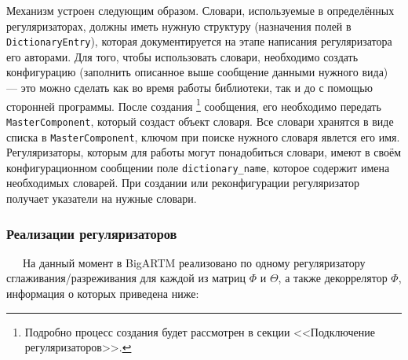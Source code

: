 Механизм устроен следующим образом. Словари, используемые в определённых регуляризаторах, должны иметь нужную структуру (назначения полей в \verb|DictionaryEntry|), которая документируется на этапе написания регуляризатора его авторами. Для того, чтобы использовать словари, необходимо создать конфигурацию (заполнить описанное выше сообщение данными нужного вида) --- 
это можно сделать как во время работы библиотеки, так и до с помощью сторонней программы. После создания
 \footnote{Подробно процесс создания будет рассмотрен в секции <<Подключение регуляризаторов>>.}
 сообщения, его необходимо передать \verb|MasterComponent|, который создаст объект словаря. Все словари хранятся в виде списка в \verb|MasterComponent|, ключом при поиске нужного словаря явлется его имя.
Регуляризаторы, которым для работы могут понадобиться словари, имеют в своём конфигурационном сообщении поле \verb|dictionary_name|, которое содержит имена необходимых словарей. При создании или реконфигурации регуляризатор получает указатели на нужные словари.

\subsubsection{Реализации регуляризаторов} 
$\quad\;\:$На данный момент в BigARTM реализовано по одному регуляризатору сглаживания/разреживания для каждой из матриц $\Phi$ и $\Theta$, а также декоррелятор $\Phi$, информация о которых приведена ниже:

